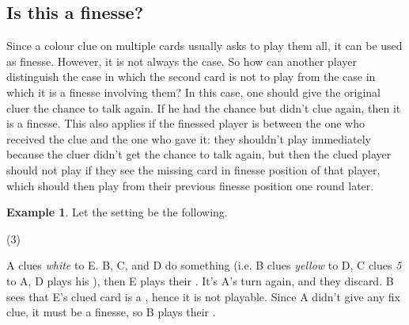 \documentclass[a4paper]{article}
\theoremstyle{plain}
\theoremstyle{definition}
\newtheorem{example}[theorem]{Example}
\begin{document}
\subsection{Is this a finesse?}

Since a colour clue on multiple cards usually asks to play them all, it can be used as finesse. However, it is not always the case. So how can another player distinguish the case in which the second card is not to play from the case in which it is a finesse involving them? In this case, one should give the original cluer the chance to talk again. If he had the chance but didn't clue again, then it is a finesse. This also applies if the finessed player is between the one who received the clue and the one who gave it: they shouldn't play immediately because the cluer didn't get the chance to talk again, but then the clued player should not play if they see the missing card in finesse position of that player, which should then play from their previous finesse position one round later.

\begin{example}
	
	Let the setting be the following.
	
	\begin{tasks}(3)
		\task[+]      
		\task[A]    
		\task[B]    
		\task[C]    
		\task[D]    
		\task[E]    
	\end{tasks}
	
	A clues \textit{white} to E. B, C, and D do something (i.e. B clues \textit{yellow} to D, C clues \textit{5} to A, D plays his ), then E plays their . It's A's turn again, and they discard. B sees that E's clued card is a , hence it is not playable. Since A didn't give any fix clue, it must be a finesse, so B plays their .
	
\end{example}
\end{document}
